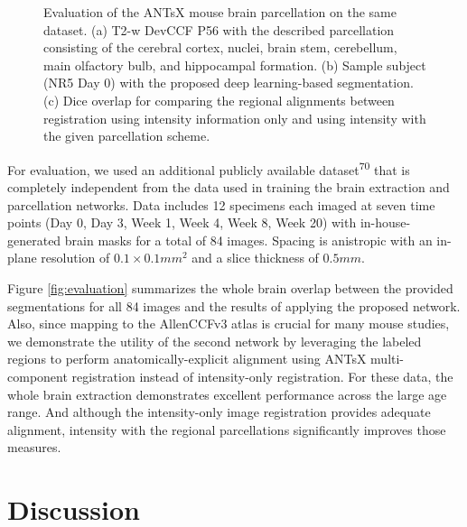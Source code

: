 \documentclass[
  12pt,
]{article}
\begin{document}
\begin{figure}
\begin{subfigure}{.75\textwidth}
  \caption{}
  \label{fig:subc}
\end{subfigure}
\caption{Evaluation of the ANTsX mouse brain parcellation on the same dataset.
(a) T2-w DevCCF P56 with the described parcellation consisting of the cerebral
cortex, nuclei, brain stem, cerebellum, main olfactory bulb, and hippocampal
formation. (b) Sample subject (NR5 Day 0) with the proposed deep learning-based
segmentation. (c) Dice overlap for comparing the regional alignments between
registration using intensity information only and using intensity with the given
parcellation scheme.}
\label{fig:evaluationParcellation}
\end{figure}

For evaluation, we used an additional publicly available
dataset\textsuperscript{70} that is completely independent from the data
used in training the brain extraction and parcellation networks. Data
includes 12 specimens each imaged at seven time points (Day 0, Day 3,
Week 1, Week 4, Week 8, Week 20) with in-house-generated brain masks for
a total of 84 images. Spacing is anistropic with an in-plane resolution
of \(0.1 \times 0.1 mm^2\) and a slice thickness of \(0.5 mm\).

Figure \ref{fig:evaluation} summarizes the whole brain overlap between
the provided segmentations for all 84 images and the results of applying
the proposed network. Also, since mapping to the AllenCCFv3 atlas is
crucial for many mouse studies, we demonstrate the utility of the second
network by leveraging the labeled regions to perform
anatomically-explicit alignment using ANTsX multi-component registration
instead of intensity-only registration. For these data, the whole brain
extraction demonstrates excellent performance across the large age
range. And although the intensity-only image registration provides
adequate alignment, intensity with the regional parcellations
significantly improves those measures.

\clearpage
\newpage

\section{Discussion}\label{discussion}
\end{document}

